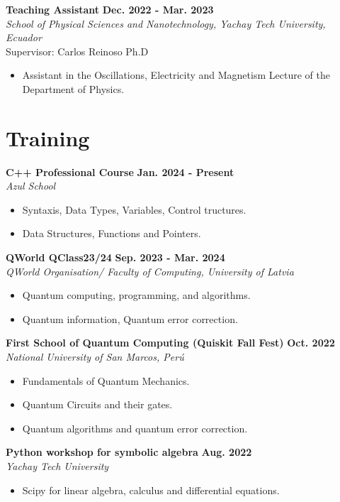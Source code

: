 \documentclass[a4paper,12pt]{article}
\begin{document}
\textbf{Teaching Assistant}
\hfill {\textbf{Dec. 2022 - Mar. 2023}}\\
\emph{School of Physical Sciences and Nanotechnology, Yachay Tech University, Ecuador}\\
Supervisor: Carlos Reinoso Ph.D
\begin{itemize}
    \item Assistant in the Oscillations, Electricity and Magnetism Lecture of the Department of Physics.
\end{itemize}
\section{Training}
\textbf{C++ Professional Course} \hfill{\textbf{Jan. 2024 - Present}}\\
\emph{Azul School }
\begin{itemize}
    \item Syntaxis, Data Types, Variables, Control tructures.
    \item Data Structures, Functions and Pointers.
\end{itemize}

\textbf{ QWorld QClass23/24} \hfill{\textbf{Sep. 2023 - Mar. 2024}}\\
\emph{QWorld Organisation/ Faculty of Computing, University of Latvia }
\begin{itemize}
    \item Quantum computing, programming, and algorithms.
    \item Quantum information, Quantum error correction.
\end{itemize}

\textbf{First School of Quantum Computing (Quiskit Fall Fest)} \hfill {\textbf{Oct. 2022}}\\
\emph{National University of San Marcos, Perú}
\begin{itemize}
    \item Fundamentals of Quantum Mechanics.
    \item Quantum Circuits and their gates.
    \item Quantum algorithms and quantum error correction.
\end{itemize}

\textbf{Python workshop for symbolic algebra} \hfill {\textbf{Aug. 2022}}\\
\emph{Yachay Tech University}
\begin{itemize}
    \item Scipy for linear algebra, calculus and differential equations.
\end{itemize}
\end{document}
